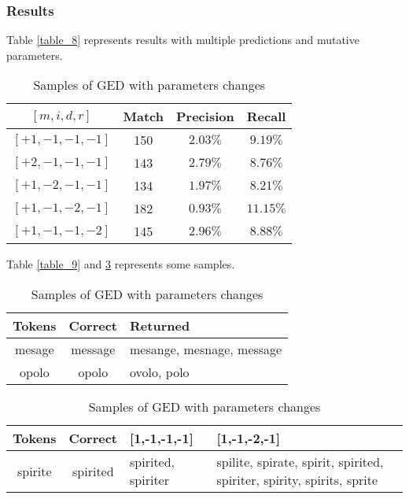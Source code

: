\documentclass[11pt]{article}
\begin{document}
\subsubsection{Results}
Table \ref{table_8} represents results with multiple predictions and mutative parameters. \\
\begin{table}[h]
    \begin{center}
        \begin{tabular}{|c|c|c|c|}
            \hline
            $[m, i, d, r]$ & Match &Precision & Recall \\ \hline
            $[+1,-1,-1,-1]$ & 150 & $2.03\%$ & $9.19\%$ \\ \hline
            $[+2,-1,-1,-1]$ & 143 & $2.79\%$ & $8.76\%$ \\ \hline
            $[+1,-2,-1,-1]$ & 134 & $1.97\%$ & $8.21\%$ \\ \hline
            $[+1,-1,-2,-1]$ & 182 & $0.93\%$ & $11.15\%$ \\ \hline
            $[+1,-1,-1,-2]$ & 145 & $2.96\%$ & $8.88\%$ \\ \hline
        \end{tabular}
        \caption{Results of GED with changes}\label{table_8}
    \end{center}
Table \ref{table_9} and \ref{table_10} represents some samples.\\
    \begin{center}
        \begin{tabular}{|c|c|p{2cm}|}
            \hline
            Tokens & Correct & Returned \\ \hline
            mesage & message & mesange, mesnage, message\\ \hline
            opolo & opolo & ovolo, polo      \\ \hline
        \end{tabular}
        \caption{Samples of GED with multiple returns}\label{table_9}
    \end{center}

    \begin{center}
        \begin{tabular}{|c|c|p{2cm}|p{2cm}|}
            \hline
            Tokens & Correct & [1,-1,-1,-1] & [1,-1,-2,-1] \\ \hline
            spirite & spirited & spirited, spiriter & spilite, spirate, spirit, spirited, spiriter, spirity, spirits, sprite\\ \hline
          
        \end{tabular}
        \caption{Samples of GED with parameters changes}\label{table_10}
    \end{center}
\end{table}
\end{document}
